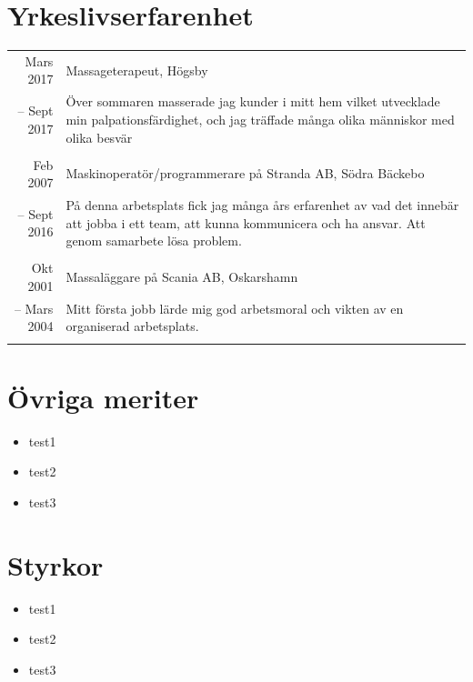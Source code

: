 \documentclass[11pt,a4paper]{article}
\begin{document}
\section{Yrkeslivserfarenhet}
\begin{tabularx}{\textwidth}{r|X}	
	Mars 2017 & Massageterapeut, Högsby \\
	-- Sept 2017 &\footnotesize{Över sommaren masserade jag kunder i mitt hem vilket utvecklade min palpationsfärdighet, och jag träffade många olika människor med olika besvär}\\
	\multicolumn{2}{c}{} \\

	Feb 2007 & Maskinoperatör/programmerare på Stranda AB, Södra Bäckebo \\
	-- Sept 2016&\footnotesize{På denna arbetsplats fick jag många års erfarenhet av vad det innebär att jobba i ett team, att kunna kommunicera och ha ansvar. Att genom samarbete lösa problem.}\\
	\multicolumn{2}{c}{} \\
	
	Okt 2001& Massaläggare på Scania AB, Oskarshamn \\
	-- Mars 2004&\footnotesize{Mitt första jobb lärde mig god arbetsmoral och vikten av en organiserad arbetsplats.}\\
	\multicolumn{2}{c}{} \\

\end{tabularx}

\section{Övriga meriter}
\begin{itemize}[leftmargin=1.5em]
	\setlength\itemsep{-0.5em}
	\item test1
	\item test2
	\item test3
\end{itemize}

\section{Styrkor}
\begin{itemize}[leftmargin=1.5em]
	\setlength\itemsep{-0.5em}
	\item test1
	\item test2
	\item test3
\end{itemize}
\end{document}
